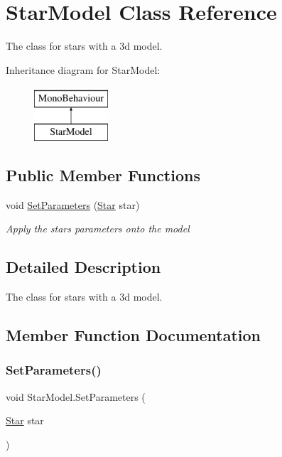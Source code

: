 \hypertarget{class_star_model}{}\section{Star\+Model Class Reference}
\label{class_star_model}


The class for stars with a 3d model.  


Inheritance diagram for Star\+Model\+:\begin{figure}[H]
\begin{center}
\leavevmode
\includegraphics[height=2.000000cm]{class_star_model}
\end{center}
\end{figure}
\subsection*{Public Member Functions}
\begin{DoxyCompactItemize}
\item 
void \mbox{\hyperlink{class_star_model_a7c66d2df8184c174a01cf2110851538c}{Set\+Parameters}} (\mbox{\hyperlink{struct_star}{Star}} star)
\begin{DoxyCompactList}\small\item\em Apply the star\textquotesingle{}s parameters onto the model \end{DoxyCompactList}\end{DoxyCompactItemize}


\subsection{Detailed Description}
The class for stars with a 3d model. 



\subsection{Member Function Documentation}
\mbox{\label{class_star_model_a7c66d2df8184c174a01cf2110851538c}} 
\subsubsection{\texorpdfstring{SetParameters()}{SetParameters()}}
{\footnotesize\ttfamily void Star\+Model.\+Set\+Parameters (\begin{DoxyParamCaption}\item[{\mbox{\hyperlink{struct_star}{Star}}}]{star }\end{DoxyParamCaption})}



